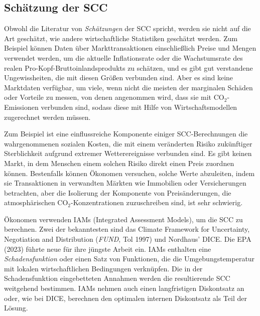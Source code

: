 \documentclass[12pt,paper=a4,DIV=12,parskip=never,chapterprefix=false,headings=standardclasses]{scrreprt}
\begin{document}
\subsection{Schätzung der SCC}
Obwohl die Literatur von \emph{Schätzungen} der SCC spricht, werden sie nicht auf die Art geschätzt, wie andere wirtschaftliche Statistiken geschätzt werden. Zum Beispiel können Daten über Markttransaktionen einschließlich Preise und Mengen verwendet werden, um die aktuelle Inflationsrate oder die Wachstumsrate des realen Pro-Kopf-Bruttoinlandsprodukts zu schätzen, und es gibt gut verstandene Ungewissheiten, die mit diesen Größen verbunden sind. Aber es sind keine Marktdaten verfügbar, um viele, wenn nicht die meisten der marginalen Schäden oder Vorteile zu messen, von denen angenommen wird, dass sie mit CO$_2$-Emissionen verbunden sind, sodass diese mit Hilfe von Wirtschaftsmodellen zugerechnet werden müssen.

Zum Beispiel ist eine einflussreiche Komponente einiger SCC-Berechnungen die wahrgenommenen sozialen Kosten, die mit einem veränderten Risiko zukünftiger Sterblichkeit aufgrund extremer Wetterereignisse verbunden sind. Es gibt keinen Markt, in dem Menschen einem solchen Risiko direkt einen Preis zuordnen können. Bestenfalls können Ökonomen versuchen, solche Werte abzuleiten, indem sie Transaktionen in verwandten Märkten wie Immobilien oder Versicherungen betrachten, aber die Isolierung der Komponente von Preisänderungen, die atmosphärischen CO$_2$-Konzentrationen zuzuschreiben sind, ist sehr schwierig.

Ökonomen verwenden IAMs (Integrated Assessment Models), um die SCC zu berechnen. Zwei der bekanntesten sind das Climate Framework for Uncertainty, Negotiation and Distribution (\emph{FUND}, Tol 1997) und Nordhaus' DICE. Die EPA (2023) führte neue für ihre jüngste Arbeit ein. IAMs enthalten eine \emph{Schadensfunktion} oder einen Satz von Funktionen, die die Umgebungstemperatur mit lokalen wirtschaftlichen Bedingungen verknüpfen. Die in der Schadensfunktion eingebetteten Annahmen werden die resultierende SCC weitgehend bestimmen. IAMs nehmen auch einen langfristigen Diskontsatz an oder, wie bei DICE, berechnen den optimalen internen Diskontsatz als Teil der Lösung.
\end{document}
